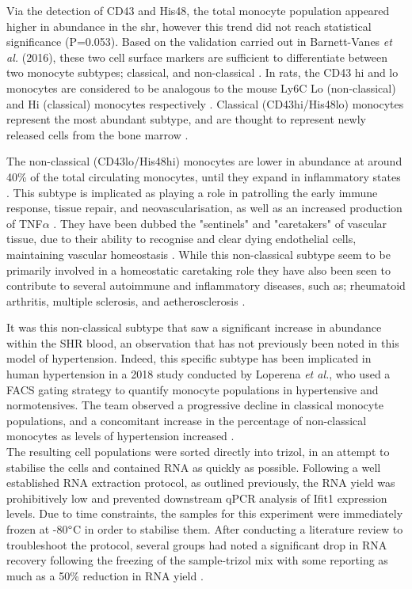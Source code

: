 Via the detection of CD43 and His48, the total monocyte population appeared higher in abundance in the \acrshort{shr}, however this trend did not reach statistical significance (P=0.053). Based on the validation carried out in Barnett-Vanes \textit{et al.} (2016), these two cell surface markers are sufficient to differentiate between two monocyte subtypes; classical, and non-classical \cite{Barnett-Vanes2016}. In rats, the CD43 hi and lo monocytes are considered to be analogous to the mouse Ly6C Lo (non-classical) and Hi (classical) monocytes respectively \cite{Strauss-Ayali2007,Sunderkotter2004}. Classical (CD43hi/His48lo) monocytes represent the most abundant subtype, and are thought to represent newly released cells from the bone marrow \cite{10.1093/cvr/cvy112}. 

The non-classical (CD43lo/His48hi) monocytes are lower in abundance at around 40\% of the total circulating monocytes, until they expand in inflammatory states \cite{10.1093/cvr/cvy112}. This subtype is implicated as playing a role in patrolling the early immune response, tissue repair, and neovascularisation, as well as an increased production of TNF$\alpha$ \cite{Belge2002}. They have been dubbed the "sentinels" and "caretakers" of vascular tissue, due to their ability to recognise and clear dying endothelial cells, maintaining vascular homeostasis \cite{Carlin2013,Quintar2017}. While this non-classical subtype seem to be primarily involved in a homeostatic caretaking role they have also been seen to contribute to several autoimmune and inflammatory diseases, such as; rheumatoid arthritis, multiple sclerosis, and aetherosclerosis \cite{Narasimhan2019}. 

It was this non-classical subtype that saw a significant increase in abundance within the SHR blood, an observation that has not previously been noted in this model of hypertension. Indeed, this specific subtype has been implicated in human hypertension in a 2018 study conducted by Loperena \textit{et al.}, who used a FACS gating strategy to quantify monocyte populations in hypertensive and normotensives. The team observed a progressive decline in classical monocyte populations, and a concomitant increase in the percentage of non-classical monocytes as levels of hypertension increased \cite{10.1093/cvr/cvy112}. \\

The resulting cell populations were sorted directly into trizol, in an attempt to stabilise the cells and contained RNA as quickly as possible. Following a well established RNA extraction protocol, as outlined previously, the RNA yield was prohibitively low and prevented downstream qPCR analysis of Ifit1 expression levels. Due to time constraints, the samples for this experiment were immediately frozen at -80$\degree$C in order to stabilise them. After conducting a literature review to troubleshoot the protocol, several groups had noted a significant drop in RNA recovery following the freezing of the sample-trizol mix with some reporting as much as a 50\% reduction in RNA yield \cite{CellAnalysisFacility}.

